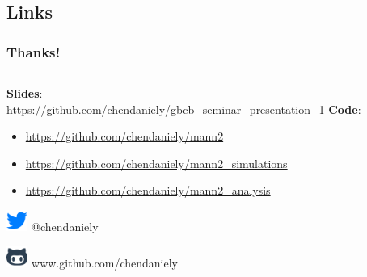 \documentclass[compress]{beamer}
\begin{document}
\subsection{Links}
    \begin{frame}[Basic2] \frametitle{Thanks!}
       \begin{columns}
           \begin{column}{0.57\textwidth}
                \tiny
                
                \textbf{Slides}:\\
                    \url{https://github.com/chendaniely/gbcb_seminar_presentation_1}
                \vspace{2mm}
                \textbf{Code}:
                \begin{itemize}
                   \item \url{https://github.com/chendaniely/mann2}
                   \item \url{https://github.com/chendaniely/mann2\_simulations}
                   \item \url{https://github.com/chendaniely/mann2\_analysis}
                \end{itemize}
                
                \includegraphics[width=7mm]{../figures/font-awesome_4-6-3_twitter_256_0_007dff_none}
                @chendaniely
                
                \includegraphics[width=7mm]{../figures/brandico_2014-04-07_github_256_0_2c3e50_none}
                www.github.com/chendaniely
            \end{column}
            \begin{column}{0.43\textwidth}
                \vspace{10mm}


\end{column}
\end{columns}
\end{frame}
\end{document}
